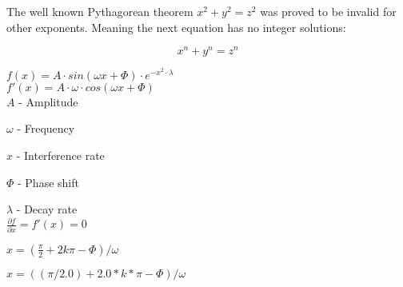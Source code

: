 \documentclass{article}
\begin{document}
The well known Pythagorean theorem \(x^2 + y^2 = z^2\) was 
proved to be invalid for other exponents. 
Meaning the next equation has no integer solutions:

\[ x^n + y^n = z^n \]

$f(x) = A \cdot sin(\omega x + \Phi) \cdot e^{-x^2 \cdot \lambda}$\\

$f'(x) = A \cdot \omega \cdot cos(\omega x + \Phi)$\\

$A$ - Amplitude

$\omega$ - Frequency

$x$ - Interference rate

$\Phi$ - Phase shift

$\lambda$ - Decay rate\\

$\frac{\partial f}{\partial x} = f'(x) = 0$

$x = (\frac{\pi}{2} + 2k\pi - \Phi) / \omega$

$x = ((\pi / 2.0) + 2.0*k*\pi - \Phi) / \omega$
\end{document}
